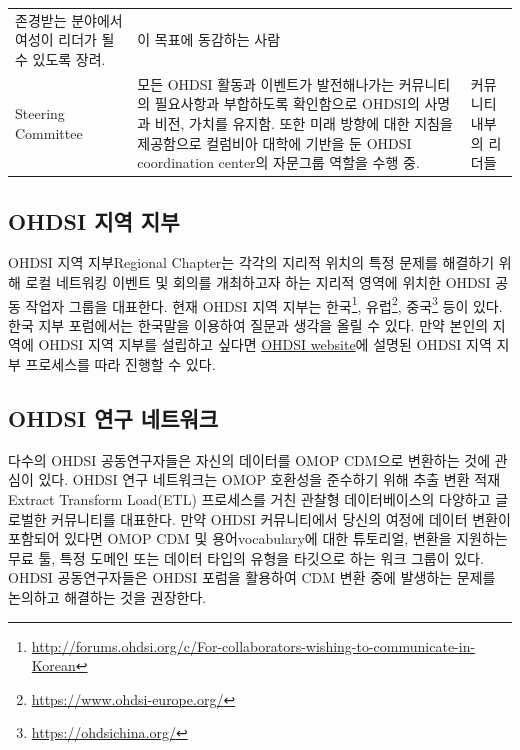 \documentclass[11pt]{book}
\let\rmarkdownfootnote\footnote%
\def\footnote{\protect\rmarkdownfootnote}
\theoremstyle{definition}
\theoremstyle{definition}
\theoremstyle{definition}
\theoremstyle{remark}
\begin{document}
\begin{longtable}[]{@{}lll@{}}
\begin{minipage}[t]{0.44\columnwidth}
존경받는 분야에서 여성이 리더가 될 수 있도록 장려.\strut
\end{minipage} & \begin{minipage}[t]{0.37\columnwidth}\raggedright\strut
이 목표에 동감하는 사람\strut
\end{minipage}\tabularnewline
\begin{minipage}[t]{0.11\columnwidth}\raggedright\strut
Steering Committee\strut
\end{minipage} & \begin{minipage}[t]{0.44\columnwidth}\raggedright\strut
모든 OHDSI 활동과 이벤트가 발전해나가는 커뮤니티의 필요사항과 부합하도록
확인함으로 OHDSI의 사명과 비전, 가치를 유지함. 또한 미래 방향에 대한
지침을 제공함으로 컬럼비아 대학에 기반을 둔 OHDSI coordination center의
자문그룹 역할을 수행 중.\strut
\end{minipage} & \begin{minipage}[t]{0.37\columnwidth}\raggedright\strut
커뮤니티 내부의 리더들\strut
\end{minipage}\tabularnewline
\bottomrule
\end{longtable}

\subsection{OHDSI 지역 지부}\label{ohdsi--}

OHDSI 지역 지부Regional Chapter는 각각의 지리적 위치의 특정 문제를
해결하기 위해 로컬 네트워킹 이벤트 및 회의를 개최하고자 하는 지리적
영역에 위치한 OHDSI 공동 작업자 그룹을 대표한다. 현재 OHDSI 지역 지부는
한국\footnote{\url{http://forums.ohdsi.org/c/For-collaborators-wishing-to-communicate-in-Korean}},
유럽\footnote{\url{https://www.ohdsi-europe.org/}}, 중국\footnote{\url{https://ohdsichina.org/}}
등이 있다. 한국 지부 포럼에서는 한국말을 이용하여 질문과 생각을 올릴 수
있다. 만약 본인의 지역에 OHDSI 지역 지부를 설립하고 싶다면
\href{https://www.ohdsi.org/who-we-are/regional-chapters}{OHDSI
website}에 설명된 OHDSI 지역 지부 프로세스를 따라 진행할 수 있다.

\subsection{OHDSI 연구 네트워크}\label{ohdsi--}

다수의 OHDSI 공동연구자들은 자신의 데이터를 OMOP CDM으로 변환하는 것에
관심이 있다. OHDSI 연구 네트워크는 OMOP 호환성을 준수하기 위해 추출 변환
적재Extract Transform Load(ETL) 프로세스를 거친 관찰형 데이터베이스의
다양하고 글로벌한 커뮤니티를 대표한다. 만약 OHDSI 커뮤니티에서 당신의
여정에 데이터 변환이 포함되어 있다면 OMOP CDM 및 용어vocabulary에 대한
튜토리얼, 변환을 지원하는 무료 툴, 특정 도메인 또는 데이터 타입의 유형을
타깃으로 하는 워크 그룹이 있다. OHDSI 공동연구자들은 OHDSI 포럼을
활용하여 CDM 변환 중에 발생하는 문제를 논의하고 해결하는 것을 권장한다.
\end{document}
